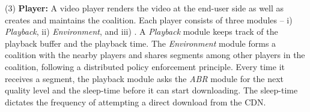 \noindent (3) {\bf Player:} A video player renders the video at the end-user side as well as creates and maintains the coalition. Each player consists of three modules -- i) \textit{Playback}, ii) \textit{Environment}, and iii) . A {\it Playback} module keeps track of the playback buffer and the playback time. The {\it Environment} module forms a coalition with the nearby players and shares segments among other players in the coalition, following a distributed policy enforcement principle.
Every time it receives a segment, the playback module asks the {\it \ac{ABR}} module for the next quality level and the sleep-time before it can start downloading. The sleep-time dictates the frequency of attempting a direct download from the \ac{CDN}. 






